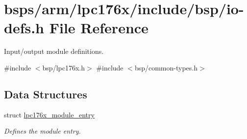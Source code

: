 \hypertarget{io-defs_8h}{}\section{bsps/arm/lpc176x/include/bsp/io-\/defs.h File Reference}
\label{io-defs_8h}


Input/output module definitions.  


{\ttfamily \#include $<$bsp/lpc176x.\+h$>$}\newline
{\ttfamily \#include $<$bsp/common-\/types.\+h$>$}\newline
\subsection*{Data Structures}
\begin{DoxyCompactItemize}
\item 
struct \mbox{\hyperlink{structlpc176x__module__entry}{lpc176x\+\_\+module\+\_\+entry}}
\begin{DoxyCompactList}\small\item\em Defines the module entry. \end{DoxyCompactList}\end{DoxyCompactItemize}
